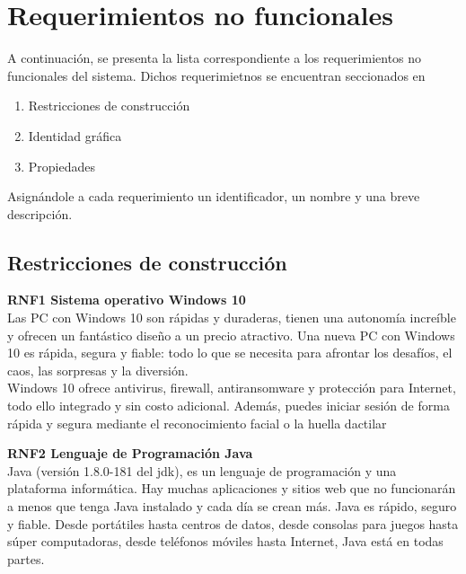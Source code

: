 












\section{Requerimientos no funcionales}

A continuación, se presenta la lista correspondiente a los requerimientos no funcionales del sistema. Dichos requerimietnos se encuentran seccionados en 
\begin{enumerate}
	\item Restricciones de construcción
	\item Identidad gráfica
	\item Propiedades
\end{enumerate} 
Asignándole a cada requerimiento un identificador, un nombre y una breve descripción.\\

\subsection{Restricciones de construcción}

\textbf{RNF1 \hspace{2cm}Sistema operativo Windows 10}\\
Las PC con Windows 10 son rápidas y duraderas, tienen una autonomía increíble y ofrecen un fantástico diseño a un precio  atractivo.  Una nueva PC con Windows 10 es rápida, segura y fiable: todo lo que se necesita para afrontar los desafíos, el caos, las sorpresas y la diversión.\\Windows 10 ofrece antivirus, firewall, antiransomware y protección para Internet, todo ello integrado y sin costo adicional. Además, puedes iniciar sesión de forma rápida y segura mediante el reconocimiento facial o la huella dactilar

\textbf{RNF2 \hspace{2cm}Lenguaje de Programación Java}\\
Java (versión 1.8.0-181 del jdk), es un lenguaje de programación y una plataforma informática. Hay muchas aplicaciones y sitios web que no funcionarán a menos que tenga Java instalado y cada día se crean más. Java es rápido, seguro y fiable. Desde portátiles hasta centros de datos, desde consolas para juegos hasta súper computadoras, desde teléfonos móviles hasta Internet, Java está en todas partes.\\

